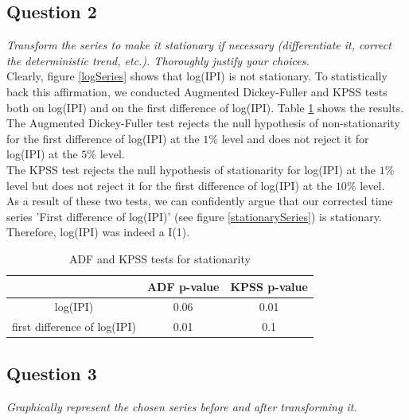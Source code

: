 \documentclass[]{article}
\begin{document}
\subsection{Question 2}
\textit{Transform the series to make it stationary if necessary (differentiate it, correct the deterministic trend, etc.). Thoroughly justify your choices.}\\

Clearly, figure \ref{logSeries} shows that log(IPI) is not stationary. To statistically back this affirmation, we conducted Augmented Dickey-Fuller and KPSS tests both on log(IPI) and on the first difference of log(IPI). Table \ref{ADFandKPSS} shows the results.\\

The Augmented Dickey-Fuller test rejects the null hypothesis of non-stationarity for the first difference of log(IPI) at the $1\%$ level and does not reject it for log(IPI) at the $5\%$ level.\\

The KPSS test rejects the null hypothesis of stationarity for log(IPI) at the $1\%$ level but does not reject it for the first difference of log(IPI) at the $10\%$ level.\\

As a result of these two tests, we can confidently argue that our corrected time series 'First difference of log(IPI)' (see figure \ref{stationarySeries}) is stationary. Therefore, log(IPI) was indeed a I(1).

\begin{table}[!h]
	\centering
	\begin{tabular}{|c||c|c|}
		\hline
		& ADF p-value & KPSS p-value\\
		\hline
		\hline
		log(IPI) & 0.06 & 0.01\\
		\hline
		first difference of log(IPI) & 0.01 & 0.1\\
		\hline
	\end{tabular}
	\caption{ADF and KPSS tests for stationarity}
	\label{ADFandKPSS}
\end{table}

\subsection{Question 3}
\textit{Graphically represent the chosen series before and after transforming it.}\\
\end{document}
